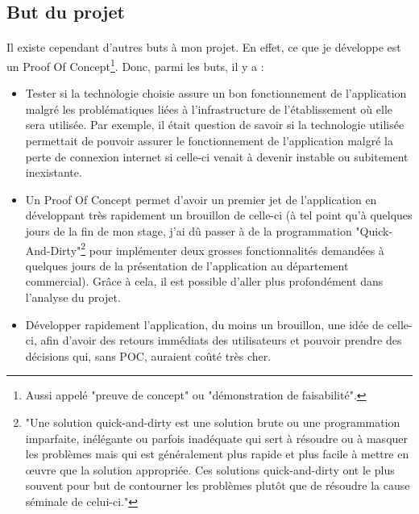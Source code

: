 \documentclass[12pt]{report}
\begin{document}
\subsection{But du projet}
\paragraph{}
Il existe cependant d'autres buts à mon projet. En effet, ce que je développe est un Proof Of Concept\footnote{Aussi appelé "preuve de concept" ou "démonstration de faisabilité".}. 
Donc, parmi les buts, il y a :
\begin{itemize}
\paragraph{}
\setlength{\itemsep}{10pt} %
\item Tester si la technologie choisie assure un bon fonctionnement de l'application malgré les problématiques liées à l'infrastructure de l'établissement où elle sera utilisée. Par exemple, il était question de savoir si la technologie utilisée permettait de pouvoir assurer le fonctionnement de l'application malgré la perte de connexion internet si celle-ci venait à devenir instable ou subitement inexistante.

\item Un Proof Of Concept permet d'avoir un premier jet de l'application en développant très rapidement un brouillon de celle-ci (à tel point qu'à quelques jours de la fin de mon stage, j'ai dû passer à de la programmation "Quick-And-Dirty"\footnote{"Une solution quick-and-dirty est une solution brute ou une programmation imparfaite, inélégante ou parfois inadéquate qui sert à résoudre ou à masquer les problèmes mais qui est généralement plus rapide et plus facile à mettre en œuvre que la solution appropriée. Ces solutions quick-and-dirty ont le plus souvent pour but de contourner les problèmes plutôt que de résoudre la cause séminale de celui-ci."\cite{QD} } pour implémenter deux grosses fonctionnalités demandées à quelques jours de la présentation de l'application au département commercial). Grâce à cela, il est possible d'aller plus profondément dans l'analyse du projet.

\item Développer rapidement l'application, du moins un brouillon, une idée de celle-ci, afin d'avoir des retours immédiats des utilisateurs et pouvoir prendre des décisions qui, sans POC, auraient coûté très cher.

\end{itemize}
\end{document}
